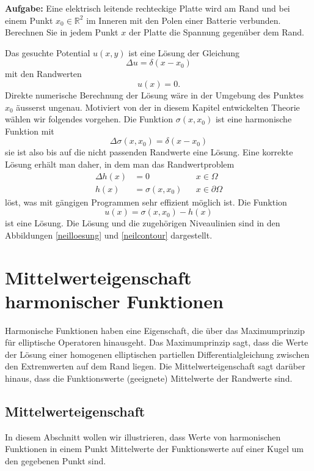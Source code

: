 {\parindent 0pt
\medskip
{\bf Aufgabe:} Eine elektrisch leitende rechteckige Platte wird am Rand und bei 
einem Punkt $x_0\in\mathbb R^2$ im Inneren mit den Polen einer Batterie verbunden. Berechnen
Sie in jedem Punkt $x$ der Platte die Spannung gegenüber dem Rand.

\medskip
}
Das gesuchte Potential $u(x,y)$ ist eine Lösung der Gleichung
\[
\Delta u=\delta(x-x_0)
\]
mit den Randwerten
\[
u(x)=0.
\]
Direkte numerische Berechnung der Lösung wäre in der Umgebung des Punktes
$x_0$ äusserst ungenau. Motiviert von der in diesem Kapitel entwickelten
Theorie wählen wir folgendes vorgehen. Die Funktion $\sigma(x,x_0)$
ist eine harmonische Funktion mit 
\[
\Delta\sigma(x,x_0)=\delta(x-x_0)
\]
sie ist also bis auf die nicht passenden Randwerte eine Lösung.
Eine korrekte Lösung erhält man daher, in dem man das Randwertproblem
\begin{align*}
\Delta h(x)&=0&&x\in\Omega\\
h(x)&=\sigma(x,x_0)&&x\in\partial\Omega
\end{align*}
löst, was mit gängigen Programmen sehr effizient möglich ist.
Die Funktion 
\[
u(x)=\sigma(x,x_0)-h(x)
\]
ist eine Lösung. Die Lösung und die zugehörigen Niveaulinien
sind in den Abbildungen \ref{neilloesung} und \ref{neilcontour} dargestellt.

\section{Mittelwerteigenschaft harmonischer Funktionen}
Harmonische Funktionen haben eine Eigenschaft, die über das Maximumprinzip
für elliptische Operatoren hinausgeht.
Das Maximumprinzip sagt, dass die Werte der Lösung einer homogenen
elliptischen partiellen Differentialgleichung zwischen den
Extremwerten auf dem Rand liegen.
Die Mittelwerteigenschaft sagt darüber hinaus, dass die Funktionswerte
(geeignete) Mittelwerte der Randwerte sind.

\subsection{Mittelwerteigenschaft}
In diesem Abschnitt wollen wir illustrieren, dass
Werte von harmonischen Funktionen in einem Punkt
Mittelwerte der Funktionswerte auf einer Kugel um den gegebenen Punkt sind.

